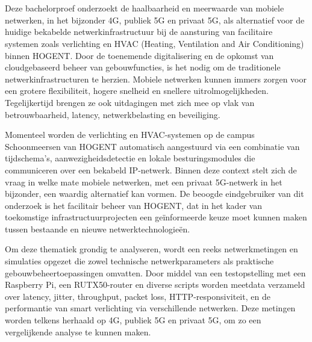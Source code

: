 
\chapter{}%
\label{ch:inleiding}

Deze bachelorproef onderzoekt de haalbaarheid en meerwaarde van mobiele netwerken, in het bijzonder 4G, publiek 5G en privaat 5G, als alternatief voor de huidige bekabelde netwerkinfrastructuur bij de aansturing van facilitaire systemen zoals verlichting en HVAC (Heating, Ventilation and Air Conditioning) binnen HOGENT. Door de toenemende digitalisering en de opkomst van cloudgebaseerd beheer van gebouwfuncties, is het nodig om de traditionele netwerkinfrastructuren te herzien. Mobiele netwerken kunnen immers zorgen voor een grotere flexibiliteit, hogere snelheid en snellere uitrolmogelijkheden. Tegelijkertijd brengen ze ook uitdagingen met zich mee op vlak van betrouwbaarheid, latency, netwerkbelasting en beveiliging. \newline 

Momenteel worden de verlichting en HVAC-systemen op de campus Schoonmeersen van HOGENT automatisch aangestuurd via een combinatie van tijdschema’s, aanwezigheidsdetectie en lokale besturingsmodules die communiceren over een bekabeld IP-netwerk. Binnen deze context stelt zich de vraag in welke mate mobiele netwerken, met  een privaat 5G-netwerk in het bijzonder, een waardig alternatief kan vormen. De beoogde eindgebruiker van dit onderzoek is het facilitair beheer van HOGENT, dat in het kader van toekomstige infrastructuurprojecten een geïnformeerde keuze moet kunnen maken tussen bestaande en nieuwe netwerktechnologieën. \newline

Om deze thematiek grondig te analyseren, wordt een reeks netwerkmetingen en simulaties opgezet die zowel technische netwerkparameters als praktische gebouwbeheertoepassingen omvatten. Door middel van een testopstelling met een Raspberry Pi, een RUTX50-router en diverse scripts worden meetdata verzameld over latency, jitter, throughput, packet loss, HTTP-responsiviteit, en de performantie van smart verlichting via verschillende netwerken. Deze metingen worden telkens herhaald op 4G, publiek 5G en privaat 5G, om zo een vergelijkende analyse te kunnen maken. \newline

